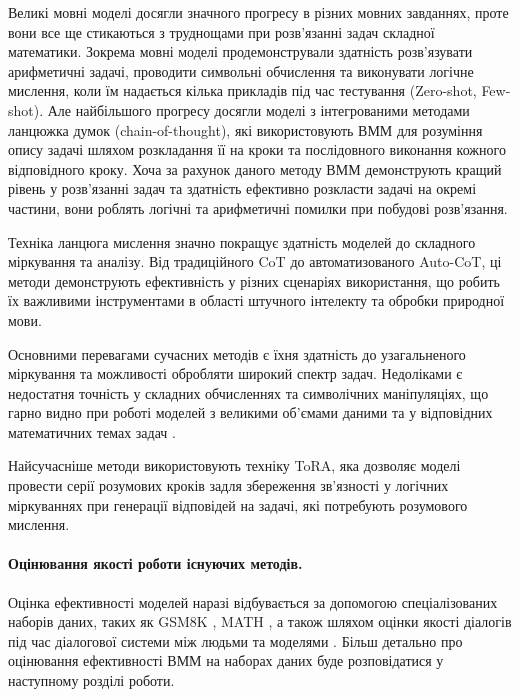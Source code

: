 Великі мовні моделі досягли значного прогресу в різних мовних завданнях, проте вони все ще стикаються з труднощами при розв'язанні задач складної математики. Зокрема мовні моделі продемонстрували здатність розв'язувати арифметичні задачі, проводити символьні обчислення та виконувати логічне мислення, коли їм надається кілька прикладів під час тестування (Zero-shot, Few-shot). Але найбільшого прогресу досягли моделі з інтегрованими методами ланцюжка думок (chain-of-thought), які використовують ВММ для розуміння опису задачі шляхом розкладання її на кроки та послідовного виконання кожного відповідного кроку. Хоча за рахунок даного методу ВММ демонструють кращий рівень у розв'язанні задач та здатність ефективно розкласти задачі на окремі частини, вони роблять логічні та арифметичні помилки при побудові розв'язання.

Техніка ланцюга мислення значно покращує здатність моделей до складного міркування та аналізу. Від традиційного CoT до автоматизованого Auto-CoT, ці методи демонструють ефективність у різних сценаріях використання, що робить їх важливими інструментами в області штучного інтелекту та обробки природної мови.

Основними перевагами сучасних методів є їхня здатність до узагальненого міркування та можливості обробляти широкий спектр задач. Недоліками є недостатня точність у складних обчисленнях та символічних маніпуляціях, що гарно видно при роботі моделей з великими об'ємами даними та у відповідних математичних темах задач \cite{frieder2023mathematicalcapabilitieschatgpt}.

Найсучасніше методи використовують техніку ToRA, яка дозволяє моделі провести серії розумових кроків задля збереження зв'язності у логічних міркуваннях при генерації відповідей на задачі, які потребують розумового мислення.

\paragraph{Оцінювання якості роботи існуючих методів.}
Оцінка ефективності моделей наразі відбувається за допомогою спеціалізованих наборів даних, таких як GSM8K \cite{cobbe2021trainingverifierssolvemath}, MATH \cite{hendrycks2021measuringmathematicalproblemsolving}, а також шляхом оцінки якості діалогів під час діалогової системи між людьми та моделями \cite{collins2023evaluatinglanguagemodelsmathematics}. Більш детально про оцінювання ефективності ВММ на наборах даних буде розповідатися у наступному розділі роботи.

